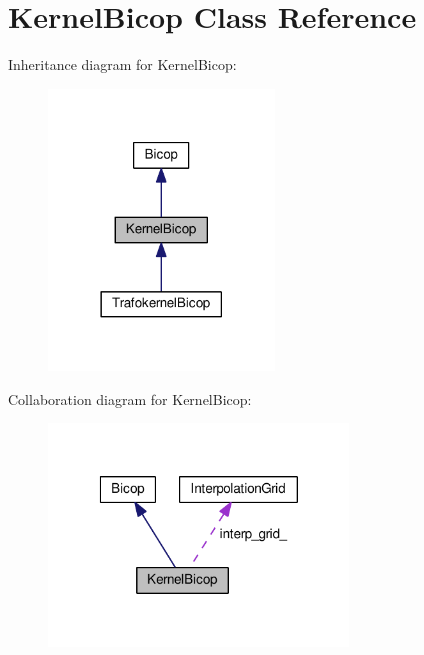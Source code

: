 \hypertarget{class_kernel_bicop}{\section{Kernel\+Bicop Class Reference}
\label{class_kernel_bicop}
}


Inheritance diagram for Kernel\+Bicop\+:\nopagebreak
\begin{figure}[H]
\begin{center}
\leavevmode
\includegraphics[width=170pt]{class_kernel_bicop__inherit__graph}
\end{center}
\end{figure}


Collaboration diagram for Kernel\+Bicop\+:\nopagebreak
\begin{figure}[H]
\begin{center}
\leavevmode
\includegraphics[width=226pt]{class_kernel_bicop__coll__graph}
\end{center}
\end{figure}
